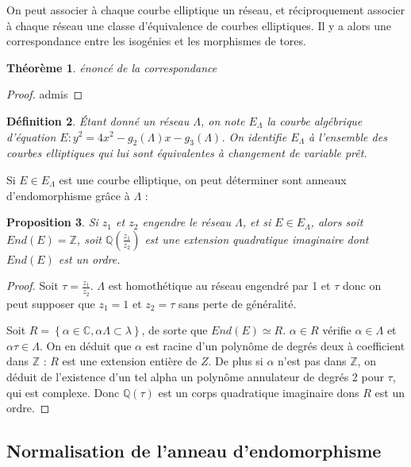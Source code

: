 \documentclass{article}
\newcommand{\Z}[0]{\mathbb{Z}}
\newcommand{\Q}[0]{\mathbb{Q}}
\newcommand{\C}[0]{\mathbb{C}}
\newtheorem{The}{Théorème}[section]
\newtheorem{Prop}[The]{Proposition}
\newtheorem{Def}[The]{Définition}
\begin{document}
On peut associer à chaque courbe elliptique un réseau, et réciproquement associer à chaque réseau une classe d'équivalence de courbes elliptiques. Il y a alors une correspondance entre les isogénies et les morphismes de tores. 

\begin{The}
	énoncé de la correspondance
\end{The}

\begin{proof}
	admis
\end{proof}

\begin{Def}
	Étant donné un réseau $\Lambda$, on note $E_{\Lambda}$ la courbe algébrique d'équation $E : y^{2} = 4x^{2} - g_2 \left( \Lambda\right) x - g_3\left( \Lambda\right)$. On identifie $E_{\Lambda}$ à l'ensemble des courbes elliptiques qui lui sont équivalentes à changement de variable prêt. 
\end{Def}

Si $E\in E_{\Lambda}$ est une courbe elliptique, on peut déterminer sont anneaux d'endomorphisme grâce à $\Lambda$ :

\begin{Prop}
	Si $z_1$ et $z_2$ engendre le réseau $\Lambda$, et si $E\in E_{\Lambda}$, alors soit $End(E) = \Z$, soit $\Q\left( \frac{z_1}{z_2}\right)$ est une extension quadratique imaginaire dont $End(E)$ est un ordre. 
\end{Prop}

\begin{proof}
	Soit $\tau = \frac{z_1}{z_2}$. $\Lambda$ est homothétique au réseau engendré par 1 et $\tau$ donc on peut supposer que $z_1 = 1$ et $z_2 = \tau$ sans perte de généralité. 
	
	Soit $R =  \left\lbrace\alpha\in\C, \alpha\Lambda\subset\lambda\right\rbrace$, de sorte que $End(E)\simeq R$. $\alpha\in R$ vérifie $\alpha\in\Lambda$ et $\alpha\tau\in\Lambda$. On en déduit que $\alpha$ est racine d'un polynôme de degrés deux à coefficient dans $\Z$ : $R$ est une extension entière de $Z$. De plus si $\alpha$ n'est pas dans $\Z$, on déduit de l'existence d'un tel alpha un polynôme annulateur de degrés 2 pour $\tau$, qui est complexe. Donc $\Q\left(\tau\right)$ est un corps quadratique imaginaire dons $R$ est un ordre. 
\end{proof}

\subsection{Normalisation de l'anneau d'endomorphisme}
\end{document}
